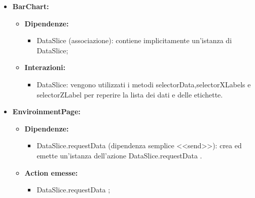 \begin{itemize}
    \item \textbf{BarChart:}
    \begin{itemize}
        \item \textbf{Dipendenze:}
        \begin{itemize}
            \item DataSlice (associazione): contiene implicitamente un'istanza di DataSlice;
        \end{itemize} 
        \item \textbf{Interazioni:}
        \begin{itemize}
            \item DataSlice: vengono utilizzati i metodi selectorData,selectorXLabels e selectorZLabel per reperire la lista dei dati e delle etichette.
        \end{itemize} 
    \end{itemize}

    \item \textbf{EnviroinmentPage:}
    \begin{itemize}
        \item \textbf{Dipendenze:}
        \begin{itemize}
            \item DataSlice.requestData (dipendenza semplice <<send>>): crea ed emette un’istanza dell’azione DataSlice.requestData .
        \end{itemize} 
        \item \textbf{Action emesse:}
        \begin{itemize}
            \item DataSlice.requestData ;
        \end{itemize} 
    \end{itemize}
\end{itemize}

\pagebreak

